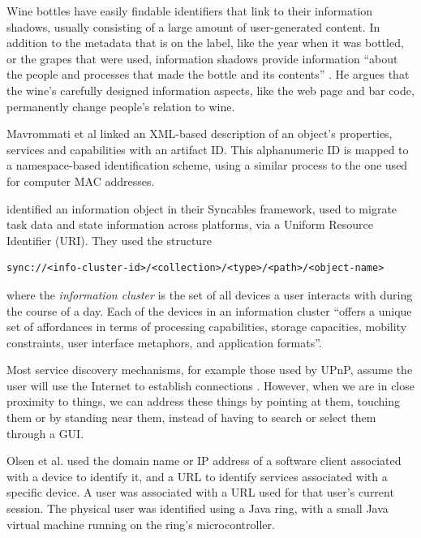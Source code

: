 Wine bottles have easily findable identifiers that link to their information shadows, usually consisting of a large amount of user-generated content. In addition to the metadata that is on the label, like the year when it was bottled, or the grapes that were used, information shadows provide information ``about the people and processes that made the bottle and its contents'' \cite{Sterling2005}. He argues that the wine's carefully designed information aspects, like the web page and bar code, permanently change people's relation to wine.


Mavrommati et al \cite{Mavrommati2004} linked an XML-based description of an object's properties, services and capabilities with an artifact ID. This alphanumeric ID is mapped to a namespace-based identification scheme, using a similar process to the one used for computer MAC addresses.

\cite{Tungare2007} identified an information object in their Syncables framework, used to migrate task data and state information across platforms, via a Uniform Resource Identifier (URI). They used the structure 

\begin{verbatim}
sync://<info-cluster-id>/<collection>/<type>/<path>/<object-name>	
\end{verbatim}

where the \emph{information cluster} is the set of all devices a user interacts with during the course of a day. Each of the devices in an information cluster ``offers a unique set of affordances in terms of processing capabilities, storage capacities, mobility constraints, user interface metaphors, and application formats''.

Most service discovery mechanisms, for example those used by \ac{UPnP}, assume the user will use the Internet to establish connections \cite{Jeronimo2009}. However, when we are in close proximity to things, we can address these things by pointing at them, touching them or by standing near them, instead of having to search or select them through a \ac{GUI}.

Olsen et al. \cite{Olsen2001} used the domain name or IP address of a software client associated with a device to identify it, and a URL to identify services associated with a specific device. A user was associated with a URL used for that user's current session. The physical user was identified using a Java ring, with a small Java virtual machine running on the ring's microcontroller. 

